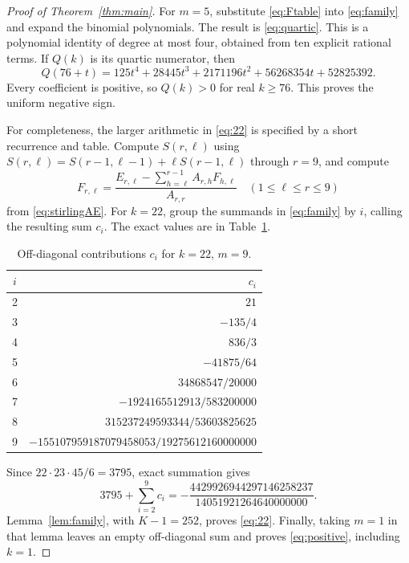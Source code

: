 \documentclass[11pt]{article}
\begin{document}
\begin{proof}[Proof of Theorem~\ref{thm:main}]
For $m=5$, substitute \eqref{eq:Ftable} into \eqref{eq:family} and expand
the binomial polynomials. The result is \eqref{eq:quartic}. This is a
polynomial identity of degree at most four, obtained from ten explicit
rational terms. If $Q(k)$ is its quartic numerator, then
\begin{equation}\label{eq:shift}
 Q(76+t)=125t^4+28445t^3+2171196t^2+56268354t+52825392.
\end{equation}
Every coefficient is positive, so $Q(k)>0$ for real $k\geq76$.
This proves the uniform negative sign.

For completeness, the larger arithmetic in \eqref{eq:22} is specified
by a short recurrence and table. Compute $S(r,\ell)$ using
$S(r,\ell)=S(r-1,\ell-1)+\ell S(r-1,\ell)$ through $r=9$, and compute
\begin{equation}\label{eq:forward}
 F_{r,\ell}=\frac{E_{r,\ell}-\sum_{h=\ell}^{r-1}A_{r,h}F_{h,\ell}}
 {A_{r,r}}\quad(1\leq\ell\leq r\leq9)
\end{equation}
from \eqref{eq:stirlingAE}. For $k=22$, group the summands in
\eqref{eq:family} by $i$, calling the resulting sum $c_i$.
The exact values are in Table~\ref{tab:22}.
\begin{table}[htbp]
\centering
\caption{Off-diagonal contributions $c_i$ for $k=22$, $m=9$.}
\label{tab:22}
\begin{tabular}{cr}
\toprule
$i$ & $c_i$\\
\midrule
2 & $21$\\
3 & $-135/4$\\
4 & $836/3$\\
5 & $-41875/64$\\
6 & $34868547/20000$\\
7 & $-1924165512913/583200000$\\
8 & $315237249593344/53603825625$\\
9 & $-155107959187079458053/19275612160000000$\\
\bottomrule
\end{tabular}
\end{table}
Since $22\cdot23\cdot45/6=3795$, exact summation gives
\[
 3795+\sum_{i=2}^9 c_i
 =-\frac{4429926944297146258237}{14051921264640000000}.
\]
Lemma~\ref{lem:family}, with $K-1=252$, proves \eqref{eq:22}.
Finally, taking $m=1$ in that lemma leaves an empty off-diagonal sum and
proves \eqref{eq:positive}, including $k=1$.
\end{proof}
\end{document}
